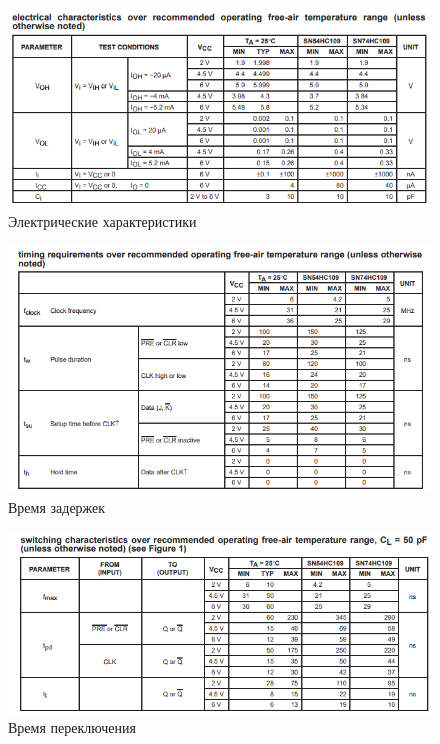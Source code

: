 \begin{figure}[H]
	\centering
	\includegraphics[width=0.95\linewidth]{imgs/8/ti3}
	\caption{Электрические характеристики}
	\label{fig:8_ti3}
\end{figure}

\begin{figure}[H]
	\centering
	\includegraphics[width=0.95\linewidth]{imgs/8/ti4}
	\caption{Время задержек}
	\label{fig:8_ti4}
\end{figure}

\begin{figure}[H]
	\centering
	\includegraphics[width=0.95\linewidth]{imgs/8/ti5}
	\caption{Время переключения}
	\label{fig:8_ti5}
\end{figure}